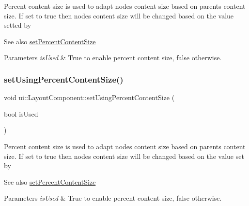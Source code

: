 Percent content size is used to adapt node\textquotesingle{}s content size based on parent\textquotesingle{}s content size. If set to true then node\textquotesingle{}s content size will be changed based on the value setted by \begin{DoxySeeAlso}{See also}
\hyperlink{classui_1_1LayoutComponent_ac1b75e3b3340dfeead80af4bc6732ef5}{set\+Percent\+Content\+Size} 
\end{DoxySeeAlso}

\begin{DoxyParams}{Parameters}
{\em is\+Used} & True to enable percent content size, false otherwise. \\
\hline
\end{DoxyParams}
\mbox{\label{classui_1_1LayoutComponent_a1b647bfd14f2c29fd9790e0aa753bf26}} 
\subsubsection{\texorpdfstring{set\+Using\+Percent\+Content\+Size()}{setUsingPercentContentSize()}\hspace{0.1cm}{\footnotesize\ttfamily [2/2]}}
{\footnotesize\ttfamily void ui\+::\+Layout\+Component\+::set\+Using\+Percent\+Content\+Size (\begin{DoxyParamCaption}\item[{bool}]{is\+Used }\end{DoxyParamCaption})}

Percent content size is used to adapt node\textquotesingle{}s content size based on parent\textquotesingle{}s content size. If set to true then node\textquotesingle{}s content size will be changed based on the value set by \begin{DoxySeeAlso}{See also}
\hyperlink{classui_1_1LayoutComponent_ac1b75e3b3340dfeead80af4bc6732ef5}{set\+Percent\+Content\+Size} 
\end{DoxySeeAlso}

\begin{DoxyParams}{Parameters}
{\em is\+Used} & True to enable percent content size, false otherwise. \\
\hline
\end{DoxyParams}
\mbox{\label{classui_1_1LayoutComponent_a3fa4ab390686d8cab0ee1f3d1ff56e86}} 
